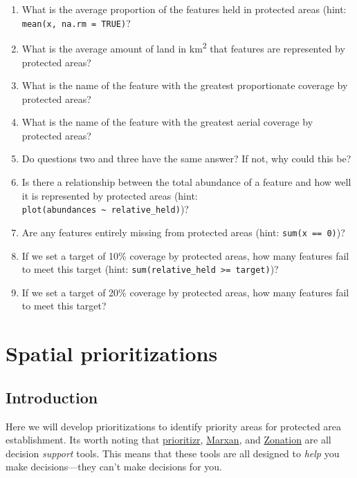 \documentclass[12pt,]{book}
\providecommand{\tightlist}{%
  \setlength{\itemsep}{0pt}\setlength{\parskip}{0pt}}
\let\BeginKnitrBlock\begin \let\EndKnitrBlock\end
\begin{document}
\BeginKnitrBlock{rmdquestion}
\begin{enumerate}
\def\labelenumi{\arabic{enumi}.}
\tightlist
\item
  What is the average proportion of the features held in protected areas
  (hint: \texttt{mean(x,\ na.rm\ =\ TRUE)}?
\item
  What is the average amount of land in km\textsuperscript{2} that
  features are represented by protected areas?
\item
  What is the name of the feature with the greatest proportionate
  coverage by protected areas?
\item
  What is the name of the feature with the greatest aerial coverage by
  protected areas?
\item
  Do questions two and three have the same answer? If not, why could
  this be?
\item
  Is there a relationship between the total abundance of a feature and
  how well it is represented by protected areas (hint:
  \texttt{plot(abundances\ \textasciitilde{}\ relative\_held)})?
\item
  Are any features entirely missing from protected areas (hint:
  \texttt{sum(x\ ==\ 0)})?
\item
  If we set a target of 10\% coverage by protected areas, how many
  features fail to meet this target (hint:
  \texttt{sum(relative\_held\ \textgreater{}=\ target)})?
\item
  If we set a target of 20\% coverage by protected areas, how many
  features fail to meet this target?
\end{enumerate}
\EndKnitrBlock{rmdquestion}

\chapter{Spatial prioritizations}\label{spatial-prioritizations}

\section{Introduction}\label{introduction-2}

Here we will develop prioritizations to identify priority areas for
protected area establishment. Its worth noting that
\href{https://prioritizr.net/}{prioritizr},
\href{http://marxan.org/}{Marxan}, and
\href{https://www.helsinki.fi/en/researchgroups/digital-geography-lab/software-developed-in-cbig\#section-52992}{Zonation}
are all decision \emph{support} tools. This means that these tools are
all designed to \emph{help} you make decisions---they can't make
decisions for you.
\end{document}
